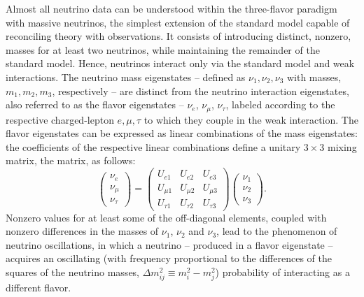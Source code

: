 Almost all neutrino data can be understood within the three-flavor paradigm 
with massive neutrinos,
the simplest extension of the standard model capable of reconciling 
theory with observations.  
It consists of introducing distinct, nonzero, masses for at least two 
neutrinos, while maintaining the remainder of the standard model. Hence, neutrinos 
interact only via the standard model  and   weak 
interactions. The neutrino mass eigenstates -- defined as $\nu_1,\nu_2, \nu_3$ 
with masses, $m_1, m_2, m_3$, respectively -- are distinct from the neutrino 
 interaction eigenstates, also referred to as the flavor 
eigenstates -- $\nu_e$, $\nu_{\mu}$, $\nu_{\tau}$, labeled according 
to the respective charged-lepton $e,\mu,\tau$ to which they couple in 
the  weak interaction. The flavor eigenstates can be expressed 
as linear combinations of the mass eigenstates: 
the coefficients of the respective linear combinations define a 
unitary $3\times 3$ mixing matrix, the 
 matrix, as follows:
\begin{equation}
\left(\begin{array}{c} \nu_e \\ \nu_{\mu} \\ \nu_{\tau} \end{array}\right) = \left(\begin{array}{ccc} U_{e1} & U_{e2} & U_{e3} \\  U_{\mu1} & U_{\mu2} & U_{\mu3}  \\  U_{\tau1} & U_{\tau2} & U_{\tau3}  \end{array}\right) \left(\begin{array}{c} \nu_1 \\ \nu_2 \\ \nu_3 \end{array}\right).
\end{equation}
Nonzero values for at least some of the off-diagonal elements, coupled with nonzero 
differences in the masses of $\nu_1$, $\nu_2$ and $\nu_3$, lead to the phenomenon of 
neutrino oscillations, in which a neutrino -- %
produced in a  
flavor eigenstate -- acquires an oscillating (with frequency proportional to 
the differences of the squares of the neutrino masses, $\Delta m^2_{ij}\equiv m_i^2-m_j^2$) 
probability of interacting as a different flavor.


